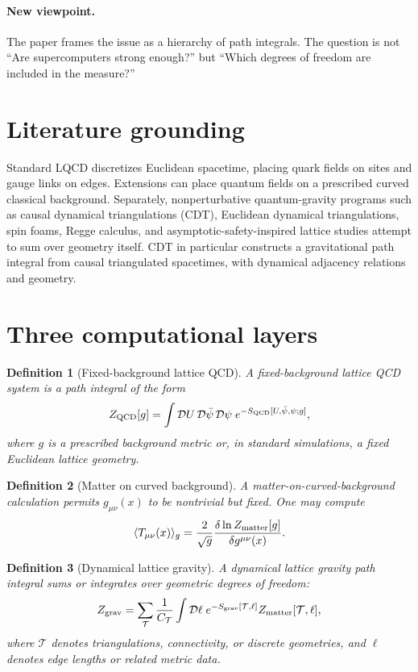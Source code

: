 \documentclass[11pt]{article}
\newtheorem{definition}{Definition}
\theoremstyle{remark}
\begin{document}
\paragraph{New viewpoint.} The paper frames the issue as a hierarchy of path integrals. The question is not ``Are supercomputers strong enough?'' but ``Which degrees of freedom are included in the measure?''

\section{Literature grounding}

Standard LQCD discretizes Euclidean spacetime, placing quark fields on sites and gauge links on edges. Extensions can place quantum fields on a prescribed curved classical background. Separately, nonperturbative quantum-gravity programs such as causal dynamical triangulations (CDT), Euclidean dynamical triangulations, spin foams, Regge calculus, and asymptotic-safety-inspired lattice studies attempt to sum over geometry itself. CDT in particular constructs a gravitational path integral from causal triangulated spacetimes, with dynamical adjacency relations and geometry.

\section{Three computational layers}

\begin{definition}[Fixed-background lattice QCD]
A fixed-background lattice QCD system is a path integral of the form
\begin{equation}
Z_{\rm QCD}[g]=\int \mathcal D U\,\mathcal D\bar\psi\,\mathcal D\psi\;e^{-S_{\rm QCD}[U,\bar\psi,\psi;g]},
\end{equation}
where $g$ is a prescribed background metric or, in standard simulations, a fixed Euclidean lattice geometry.
\end{definition}

\begin{definition}[Matter on curved background]
A matter-on-curved-background calculation permits $g_{\mu\nu}(x)$ to be nontrivial but fixed. One may compute
\begin{equation}
\langle T_{\mu\nu}(x)\rangle_g=\frac{2}{\sqrt g}\frac{\delta \ln Z_{\rm matter}[g]}{\delta g^{\mu\nu}(x)}.
\end{equation}
\end{definition}

\begin{definition}[Dynamical lattice gravity]
A dynamical lattice gravity path integral sums or integrates over geometric degrees of freedom:
\begin{equation}
Z_{\rm grav}=\sum_{\mathcal T}\frac{1}{C_{\mathcal T}}\int \mathcal D \ell\;e^{-S_{\rm grav}[\mathcal T,\ell]}Z_{\rm matter}[\mathcal T,\ell],
\end{equation}
where $\mathcal T$ denotes triangulations, connectivity, or discrete geometries, and $\ell$ denotes edge lengths or related metric data.
\end{definition}
\end{document}

